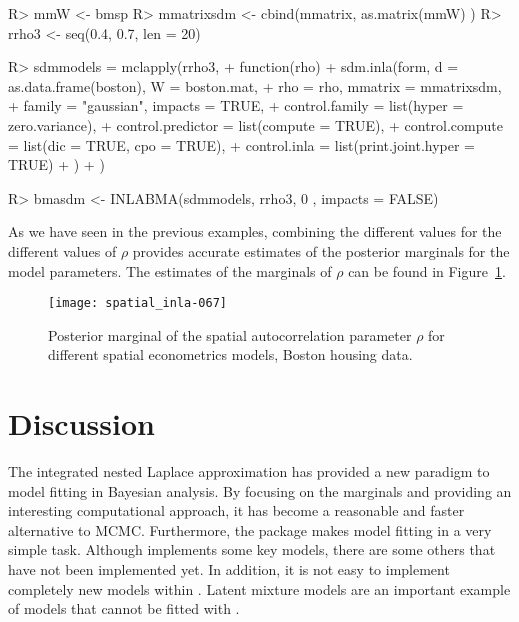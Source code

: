 \documentclass[article]{jss}
\begin{document}
\begin{Schunk}
\begin{Sinput}
R> mmW <- bmsp %*% mmatrix[,-1]#Remove intercept
R> mmatrixsdm <- cbind(mmatrix, as.matrix(mmW) )
R> rrho3 <- seq(0.4, 0.7, len = 20)
\end{Sinput}
\end{Schunk}

\begin{Schunk}
\begin{Sinput}
R> sdmmodels = mclapply(rrho3,
+          function(rho) {
+                  sdm.inla(form, d = as.data.frame(boston), W = boston.mat, 
+  			rho = rho, mmatrix = mmatrixsdm,
+                          family = "gaussian", impacts = TRUE,
+                          control.family = list(hyper = zero.variance),
+                          control.predictor = list(compute = TRUE),
+                          control.compute = list(dic = TRUE, cpo = TRUE),
+                          control.inla = list(print.joint.hyper = TRUE)
+                  )
+          })
\end{Sinput}
\end{Schunk}

\begin{Schunk}
\begin{Sinput}
R> bmasdm <- INLABMA(sdmmodels, rrho3, 0 , impacts = FALSE)
\end{Sinput}
\end{Schunk}

As we have seen in the previous examples, combining the different values 
for the different values of $\rho$ provides accurate estimates of the posterior
marginals for the model parameters. The estimates of the marginals of
$\rho$ can be found in Figure~\ref{fig:pmargrho}.

\begin{figure}[h]
\begin{center}
\texttt{[image: spatial\_inla-067]}
\end{center}
\caption{Posterior marginal of the spatial autocorrelation parameter $\rho$
for different spatial econometrics models, Boston housing data.}
\label{fig:pmargrho}
\end{figure} 


\section{Discussion} \label{sec:disc}

The integrated nested Laplace approximation has provided a new paradigm to
model fitting in Bayesian analysis. By focusing on the marginals and providing
an interesting computational approach, it has become a reasonable and faster
alternative to MCMC. Furthermore, the  package makes model fitting
in  a very simple task.  Although  implements some key
models, there are some others that have not been implemented yet.
In addition, it is not easy to implement completely new models within 
. Latent mixture models are an important example of models that
cannot be fitted with .
\end{document}
